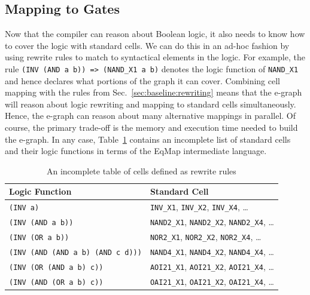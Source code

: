 \documentclass[10pt,letterpaper]{article}
\begin{document}
\subsection{Mapping to Gates}\label{sec:baseline:mapping}

Now that the compiler can reason about Boolean logic, it also needs to know how
to cover the logic with standard cells. We can do this in an ad-hoc fashion by
using rewrite rules to match to syntactical elements in the logic. For example,
the rule \texttt{(INV (AND a b)) => (NAND\_X1 a b)} denotes the logic function
of \texttt{NAND\_X1} and hence declares what portions of the graph it can
cover. Combining cell mapping with the rules from
Sec.~\ref{sec:baseline:rewriting} means that the e-graph will reason about
logic rewriting and mapping to standard cells simultaneously. Hence, the
e-graph can reason about many alternative mappings in parallel. Of course, the
primary trade-off is the memory and execution time needed to build the e-graph.
In any case, Table~\ref{tab:cells} contains an incomplete list of standard
cells and their logic functions in terms of the EqMap intermediate language.

\begin{table}[h]
    \centering
    \begin{tabular}{ll}
        \toprule
        \textbf{Logic Function}                  & \textbf{Standard Cell}                                             \\ \midrule
        \texttt{(INV a)}                         & \texttt{INV\_X1}, \texttt{INV\_X2}, \texttt{INV\_X4}, \ldots       \\
        \texttt{(INV (AND a b))}                 & \texttt{NAND2\_X1}, \texttt{NAND2\_X2}, \texttt{NAND2\_X4}, \ldots \\
        \texttt{(INV (OR a b))}                  & \texttt{NOR2\_X1}, \texttt{NOR2\_X2}, \texttt{NOR2\_X4}, \ldots    \\
        \texttt{(INV (AND (AND a b) (AND c d)))} & \texttt{NAND4\_X1}, \texttt{NAND4\_X2}, \texttt{NAND4\_X4}, \ldots \\
        \texttt{(INV (OR (AND a b) c))}          & \texttt{AOI21\_X1}, \texttt{AOI21\_X2}, \texttt{AOI21\_X4}, \ldots \\
        \texttt{(INV (AND (OR a b) c))}          & \texttt{OAI21\_X1}, \texttt{OAI21\_X2}, \texttt{OAI21\_X4}, \ldots \\
        \bottomrule
    \end{tabular}
    \caption{An incomplete table of cells defined as rewrite rules}\label{tab:cells}
\end{table}
\end{document}
